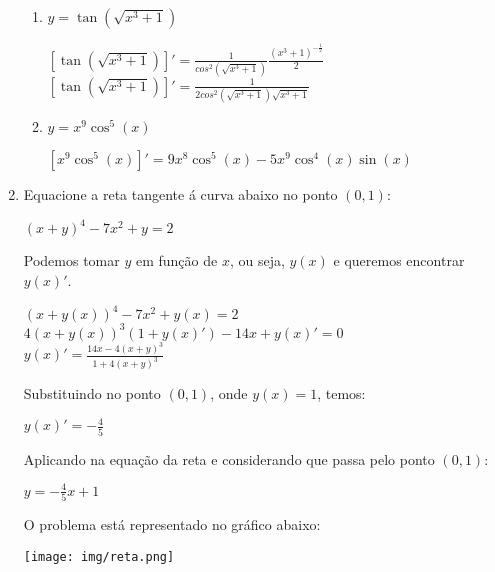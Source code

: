 \documentclass[12pt]{article}
\begin{document}
\begin{enumerate}
\begin{enumerate}
		\item $ y = \tan(\sqrt{x^3+1}) $
		\begin{center}
			$ \left[ \tan(\sqrt{x^3+1}) \right]' = \frac{1}{cos^2(\sqrt{x^3+1})} \frac{(x^3+1)^{-\frac{1}{2}}}{2} $\\
			$ \left[ \tan(\sqrt{x^3+1}) \right]' = \frac{1}{2 cos^2(\sqrt{x^3+1}) \sqrt{x^3+1} } $
		\end{center}
		
		\item $ y = x^9 \cos^5(x) $
		\begin{center}
			$ \left[ x^9 \cos^5(x)\right]' = 9x^8 \cos^5(x) - 5x^9 \cos^4(x) \sin(x) $
		\end{center}
		
	\end{enumerate}
	
	\item Equacione a reta tangente á curva abaixo no ponto $(0,1)$:
	\begin{center}
		$ \left( x + y \right)^4 -7x^2 + y = 2  $\\
	\end{center}
	
	Podemos tomar $y$ em função de $x$, ou seja, $y(x)$ e queremos encontrar $y(x)'$.
	
	\begin{center}
		$ \left( x + y(x) \right)^4 -7x^2 + y(x) = 2  $\\
		$ 4\left( x + y(x) \right)^3(1+ y(x)') -14x + y(x)' = 0  $\\
		$ y(x)' = \frac{14x - 4(x+y)^3}{1 + 4(x+y)^3} $\\
	\end{center}
	
	Substituindo no ponto $(0,1)$, onde $y(x) = 1$, temos:
	\begin{center}
		$ y(x)' = -\frac{4}{5} $\\
	\end{center}
	Aplicando na equação da reta e considerando que passa pelo ponto $(0,1)$:
	\begin{center}
		$ y = -\frac{4}{5}x + 1 $\\
	\end{center}
	
	O problema está representado no gráfico abaixo:
	\begin{center}
		\texttt{[image: img/reta.png]}
	\end{center}
		
\end{enumerate}
\end{document}
